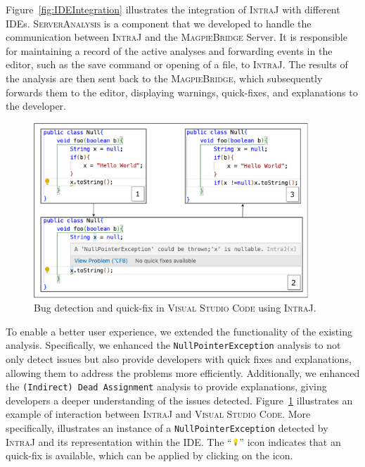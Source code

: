 Figure~\ref{fig:IDEIntegration} illustrates the integration of \textsc{IntraJ} with
different IDEs. \textsc{ServerAnalysis} is a component that we developed to handle the
communication between \textsc{IntraJ} and the \textsc{MagpieBridge} Server. It is responsible
for maintaining a record of the active analyses and forwarding events in the editor,
such as the save command or opening of a file, to \textsc{IntraJ}.
The results of the analysis are then sent back to the \textsc{MagpieBridge}, which subsequently
forwards them to the editor, displaying warnings, quick-fixes, and explanations
to the developer.
\begin{figure}[ht]
  \centering
  \includegraphics[width=0.92\textwidth]{kappa/img/IDEExample.pdf}
  \caption{\label{fig:IDEExample} Bug detection and quick-fix in \textsc{Visual Studio Code} using \textsc{IntraJ}.}
\end{figure}
To enable a better user experience, we extended the functionality of the existing analysis.
Specifically, we enhanced the \texttt{NullPointerException} analysis to not only detect issues
but also provide developers with quick fixes and explanations, allowing them to address
the problems more efficiently. Additionally, we enhanced the \texttt{(Indirect) Dead Assignment} analysis
to provide explanations, giving developers a deeper understanding of the issues detected.
Figure~\ref{fig:IDEExample} illustrates an example of interaction between \textsc{IntraJ} and
\textsc{Visual Studio Code}. More specifically, illustrates an instance of a \texttt{NullPointerException}
detected by \textsc{IntraJ} and its representation within the IDE.
The ``\includegraphics[height=8pt]{kappa/img/bulb.png}''  icon indicates that an quick-fix is available,
which can be applied by clicking on the icon.

